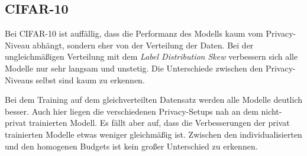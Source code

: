 \subsection{CIFAR-10}
Bei CIFAR-10 ist auffällig, dass die Performanz des Modells kaum vom Privacy-Niveau abhängt, sondern eher von der Verteilung der Daten. Bei der ungleichmäßigen Verteilung mit dem \textit{Label Distribution Skew} verbessern sich alle Modelle nur sehr langsam und unstetig. Die Unterschiede zwischen den Privacy-Niveaus selbst sind kaum zu erkennen.

Bei dem Training auf dem gleichverteilten Datensatz werden alle Modelle deutlich besser. Auch hier liegen die verschiedenen Privacy-Setups nah an dem nicht-privat trainierten Modell. Es fällt aber auf, dass die Verbesserungen der privat trainierten Modelle etwas weniger gleichmäßig ist. Zwischen den individualisierten und den homogenen Budgets ist kein großer Unterschied zu erkennen.

